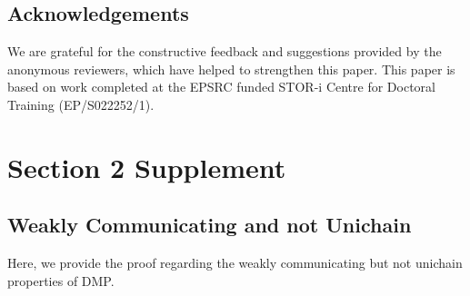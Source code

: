 \documentclass[11pt,authoryear,a4paper]{article}
\theoremstyle{definition}
\begin{document}
\subsection{Acknowledgements}
{\color{black} We are grateful for the constructive feedback and suggestions provided by the anonymous reviewers, which have helped to strengthen this paper.} This paper is based on work completed at the EPSRC funded STOR-i Centre for Doctoral Training (EP/S022252/1).




\appendix
\section{Section 2 Supplement}

\subsection{Weakly Communicating and not Unichain}
Here, we provide the proof regarding the weakly communicating but not unichain properties of DMP. 
\end{document}
